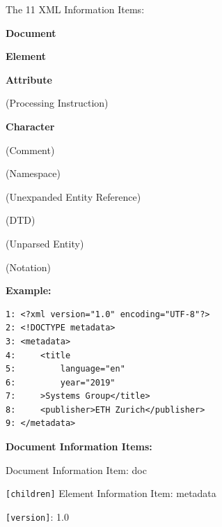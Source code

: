 \documentclass[11pt,oneside,a4paper]{article}
\begin{document}
The 11 XML Information Items:

\vspace{-\topsep}
\begin{multicols}{2}
	\begin{compactitem}
		\item \textbf{Document}
		\item \textbf{Element}
		\item \textbf{Attribute}
		\item (Processing Instruction)
		\item \textbf{Character}
		\item (Comment)
		\item (Namespace)
		\item (Unexpanded Entity Reference)
		\item (DTD)
		\item (Unparsed Entity)
		\item (Notation)
	\end{compactitem}
\end{multicols}

\textbf{Example:}
\vspace{-\topsep}
\begin{verbatim}
1: <?xml version="1.0" encoding="UTF-8"?>
2: <!DOCTYPE metadata>
3: <metadata>
4:     <title
5:         language="en"
6:         year="2019"
7:     >Systems Group</title>
8:     <publisher>ETH Zurich</publisher>
9: </metadata>
\end{verbatim}
\vspace{-\topsep}

\textbf{Document Information Items:}

\begin{compactitem}
	\item Document Information Item: doc
	\item \verb|[children]| Element Information Item: metadata
	\item \verb|[version]|: 1.0
\end{compactitem}

\newpage
\end{document}
